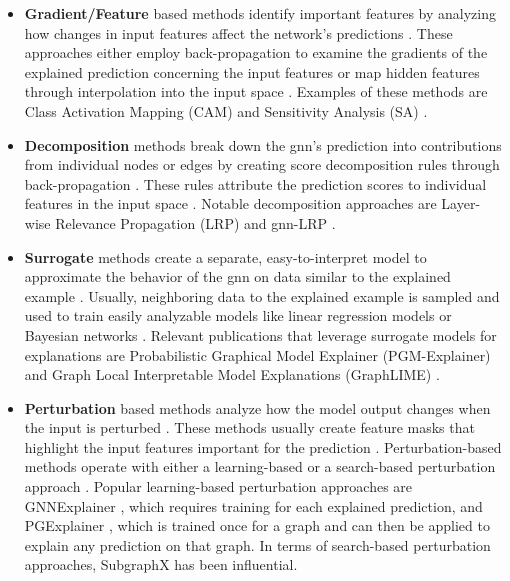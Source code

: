 \begin{itemize}
    \item \textbf{Gradient/Feature} based methods identify important features by analyzing how changes in input features affect the network's predictions \cite{yuan_explainability_2020}. These approaches either employ back-propagation to examine the gradients of the explained prediction concerning the input features or map hidden features through interpolation into the input space \cite{yuan_explainability_2020}. Examples of these methods are Class Activation Mapping (CAM)\cite{pope_explainability_2019} and Sensitivity Analysis (SA) \cite{baldassarre_explainability_2019}.
    \item \textbf{Decomposition} methods break down the \gls{gnn}'s prediction into contributions from individual nodes or edges by creating score decomposition rules through back-propagation \cite{yuan_explainability_2020}. These rules attribute the prediction scores to individual features in the input space \cite{yuan_explainability_2020, baldassarre_explainability_2019}. Notable decomposition approaches are Layer-wise Relevance Propagation (LRP) \cite{baldassarre_explainability_2019} and \gls{gnn}-LRP \cite{schnake_higher-order_2022}.
    \item \textbf{Surrogate} methods create a separate, easy-to-interpret model to approximate the behavior of the \gls{gnn} on data similar to the explained example \cite{yuan_explainability_2020}. Usually, neighboring data to the explained example is sampled and used to train easily analyzable models \cite{huang_graphlime_2023} like linear regression models \cite{duval_graphsvx_2021} or Bayesian networks \cite{vu_pgm-explainer_2020}. Relevant publications that leverage surrogate models for explanations are Probabilistic Graphical Model Explainer (PGM-Explainer) \cite{vu_pgm-explainer_2020} and Graph Local Interpretable Model Explanations (GraphLIME) \cite{huang_graphlime_2023}.
    \item \textbf{Perturbation} based methods analyze how the model output changes when the input is perturbed \cite{yuan_explainability_2020}. These methods usually create feature masks that highlight the input features important for the prediction \cite{yuan_explainability_2020, ivanovs_perturbation-based_2021}. Perturbation-based methods operate with either a learning-based or a search-based perturbation approach \cite{xia_explaining_2023}. Popular learning-based perturbation approaches are GNNExplainer \cite{ying_gnnexplainer_2019}, which requires training for each explained prediction, and PGExplainer \cite{luo_parameterized_2020}, which is trained once for a graph and can then be applied to explain any prediction on that graph. In terms of search-based perturbation approaches, SubgraphX \cite{yuan_explainability_2021} has been influential.
\end{itemize}

